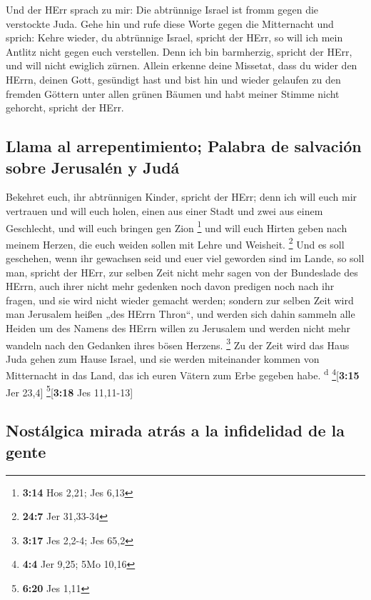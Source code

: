  Und der HErr sprach zu mir: Die abtrünnige Israel ist
fromm gegen die verstockte Juda.  Gehe hin und rufe diese
Worte gegen die Mitternacht und sprich: Kehre wieder, du abtrünnige
Israel, spricht der HErr, so will ich mein Antlitz nicht gegen euch
verstellen. Denn ich bin barmherzig, spricht der HErr, und will nicht
ewiglich zürnen.  Allein erkenne deine Missetat, dass du
wider den HErrn, deinen Gott, gesündigt hast und bist hin und wieder
gelaufen zu den fremden Göttern unter allen grünen Bäumen und habt
meiner Stimme nicht gehorcht, spricht der HErr.

\hypertarget{llama-al-arrepentimiento-palabra-de-salvaciuxf3n-sobre-jerusaluxe9n-y-juduxe1}{%
\subsection{Llama al arrepentimiento; Palabra de salvación sobre
Jerusalén y
Judá}\label{llama-al-arrepentimiento-palabra-de-salvaciuxf3n-sobre-jerusaluxe9n-y-juduxe1}}

 Bekehret euch, ihr abtrünnigen Kinder, spricht der HErr;
denn ich will euch mir vertrauen und will euch holen, einen aus einer
Stadt und zwei aus einem Geschlecht, und will euch bringen gen Zion
\footnote{\textbf{3:14} Hos 2,21; Jes 6,13}  und will
euch Hirten geben nach meinem Herzen, die euch weiden sollen mit Lehre
und Weisheit. \footnote{\textbf{24:7} Jer 31,33-34}  Und
es soll geschehen, wenn ihr gewachsen seid und euer viel geworden sind
im Lande, so soll man, spricht der HErr, zur selben Zeit nicht mehr
sagen von der Bundeslade des HErrn, auch ihrer nicht mehr gedenken noch
davon predigen noch nach ihr fragen, und sie wird nicht wieder gemacht
werden;  sondern zur selben Zeit wird man Jerusalem
heißen „des HErrn Thron``, und werden sich dahin sammeln alle Heiden um
des Namens des HErrn willen zu Jerusalem und werden nicht mehr wandeln
nach den Gedanken ihres bösen Herzens. \footnote{\textbf{3:17} Jes
  2,2-4; Jes 65,2}  Zu der Zeit wird das Haus Juda gehen
zum Hause Israel, und sie werden miteinander kommen von Mitternacht in
das Land, das ich euren Vätern zum Erbe gegeben habe.
\textsuperscript{d} \footnote{\textbf{4:4} Jer 9,25; 5Mo 10,16}{[}\textbf{3:15}
Jer 23,4{]} \footnote{\textbf{6:20} Jes 1,11}{[}\textbf{3:18} Jes
11,11-13{]}

\hypertarget{nostuxe1lgica-mirada-atruxe1s-a-la-infidelidad-de-la-gente}{%
\subsection{Nostálgica mirada atrás a la infidelidad de la
gente}\label{nostuxe1lgica-mirada-atruxe1s-a-la-infidelidad-de-la-gente}}

